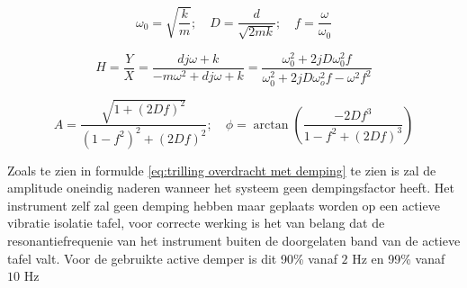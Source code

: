 \documentclass[11pt]{article}
\begin{document}
\begin{equation}
    \omega_0 = \sqrt{\frac{k}{m}}; \quad D = \frac{d}{\sqrt{2mk}}; \quad f = \frac{\omega}{\omega_0}
\end{equation}

\begin{equation}
    H = \frac{Y}{X} = \frac{dj\omega + k}{-m\omega^2 +dj\omega + k} = \frac{\omega_0^2 + 2jD\omega_0^2 f}{\omega_0^2 + 2jD\omega_o^2 f - \omega^2 f^2}
    \label{eq:trilling overdracht met demping}
\end{equation}


\begin{equation}
    A = \frac{\sqrt{1 + (2Df)^2}}{(1-f^2)^2 + (2Df)^2}; \quad \phi = \arctan\left(\frac{-2Df^3}{1-f^2 + (2Df)^3}\right)
\end{equation}

Zoals te zien in formulde \ref{eq:trilling overdracht met demping} te zien is zal de amplitude oneindig naderen wanneer het systeem geen dempingsfactor heeft. Het instrument zelf zal geen demping hebben maar geplaats worden op een actieve vibratie isolatie tafel, voor correcte werking is het van belang dat de resonantiefrequenie van het instrument buiten de doorgelaten band van de actieve tafel valt. Voor de gebruikte active demper is dit 90\% vanaf $2$ Hz en 99\% vanaf $10$ Hz \citep{DVIATTabletopActive}
\end{document}
